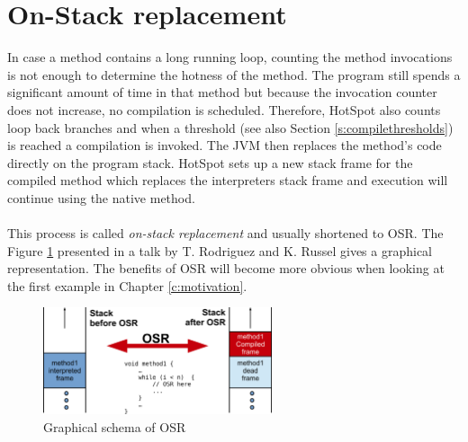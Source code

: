 \section{On-Stack replacement}
\label{s:onstackreplacement}
In case a method contains a long running loop, counting the method invocations is not enough to determine the hotness of the method. The program still spends a significant amount of time in that method but because the invocation counter does not increase, no compilation is scheduled.
Therefore, HotSpot also counts loop back branches and when a threshold (see also Section \ref{s:compilethresholds}) is reached a compilation is invoked. The JVM then replaces the method's code directly on the program stack. HotSpot sets up a new stack frame for the compiled method which replaces the interpreters stack frame and execution will continue using the native method.
\\\\
This process is called \textit{on-stack replacement} and usually shortened to OSR. The Figure \ref{f:osr} presented in a talk by T. Rodriguez and K. Russel \cite{client_compiler_talk} gives a graphical representation.
The benefits of OSR will become more obvious when looking at the first example in Chapter \ref{c:motivation}.
\begin{figure}[ht]
  \begin{center}
    \centering
    \includegraphics[width=0.6\textwidth]{figures/osr.png}
    \caption{Graphical schema of OSR}
    \label{f:osr}
  \end{center}
\end{figure}
